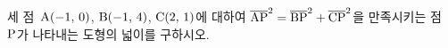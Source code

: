 세 점~$\mathrm{A}(-1,\mkern3mu 0)$, $\mathrm{B}(-1,\mkern3mu 4)$, $\mathrm{C}(2,\mkern3mu 1)$에 대하여 $\overline{\mathrm{AP}}^2=\overline{\mathrm{BP}}^2+\overline{\mathrm{CP}}^2$을 만족시키는 점~$\mathrm{P}$가 나타내는 도형의 넓이를 구하시오.
